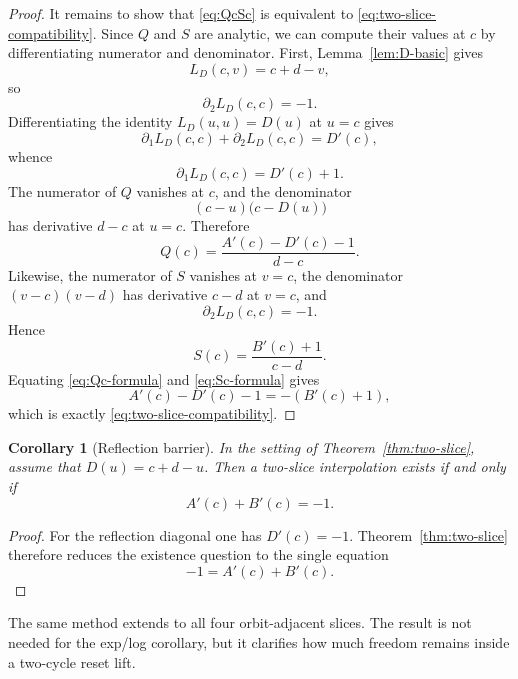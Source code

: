\documentclass[11pt]{amsart}
\numberwithin{equation}{section}
\newtheorem{corollary}[theorem]{Corollary}
\theoremstyle{remark}
\theoremstyle{definition}
\begin{document}
\begin{proof}
It remains to show that \eqref{eq:QcSc} is equivalent to \eqref{eq:two-slice-compatibility}. Since $Q$ and $S$ are analytic, we can compute their values at $c$ by differentiating numerator and denominator. First, Lemma~\ref{lem:D-basic} gives
\[
L_D(c,v)=c+d-v,
\]
so
\[
\partial_2 L_D(c,c)=-1.
\]
Differentiating the identity $L_D(u,u)=D(u)$ at $u=c$ gives
\[
\partial_1 L_D(c,c)+\partial_2 L_D(c,c)=D'(c),
\]
whence
\[
\partial_1 L_D(c,c)=D'(c)+1.
\]
The numerator of $Q$ vanishes at $c$, and the denominator
\[
(c-u)\bigl(c-D(u)\bigr)
\]
has derivative $d-c$ at $u=c$. Therefore
\begin{equation}\label{eq:Qc-formula}
Q(c)=\frac{A'(c)-D'(c)-1}{d-c}.
\end{equation}
Likewise, the numerator of $S$ vanishes at $v=c$, the denominator $(v-c)(v-d)$ has derivative $c-d$ at $v=c$, and
\[
\partial_2 L_D(c,c)=-1.
\]
Hence
\begin{equation}\label{eq:Sc-formula}
S(c)=\frac{B'(c)+1}{c-d}.
\end{equation}
Equating \eqref{eq:Qc-formula} and \eqref{eq:Sc-formula} gives
\[
A'(c)-D'(c)-1=-(B'(c)+1),
\]
which is exactly \eqref{eq:two-slice-compatibility}.
\end{proof}

\begin{corollary}[Reflection barrier]\label{cor:reflection-barrier}
In the setting of Theorem~\ref{thm:two-slice}, assume that $D(u)=c+d-u$. Then a two-slice interpolation exists if and only if
\[
A'(c)+B'(c)=-1.
\]
\end{corollary}

\begin{proof}
For the reflection diagonal one has $D'(c)=-1$. Theorem~\ref{thm:two-slice} therefore reduces the existence question to the single equation
\[
-1=A'(c)+B'(c).
\]
\end{proof}

The same method extends to all four orbit-adjacent slices. The result is not needed for the exp/log corollary, but it clarifies how much freedom remains inside a two-cycle reset lift.
\end{document}
